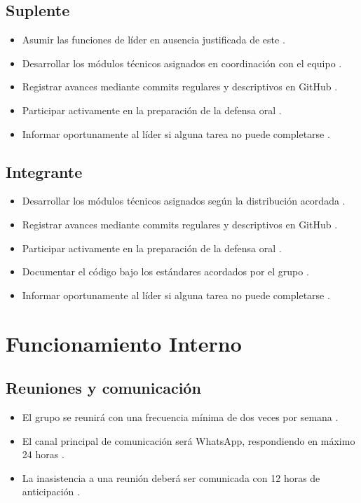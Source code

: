 \documentclass[11pt, a4paper]{article}
\begin{document}
\subsection{Suplente}
\begin{itemize}
    \item Asumir las funciones de líder en ausencia justificada de este \cite{34}.
    \item Desarrollar los módulos técnicos asignados en coordinación con el equipo \cite{35}.
    \item Registrar avances mediante commits regulares y descriptivos en GitHub \cite{36}.
    \item Participar activamente en la preparación de la defensa oral \cite{37}.
    \item Informar oportunamente al líder si alguna tarea no puede completarse \cite{38}.
\end{itemize}

\subsection{Integrante}
\begin{itemize}
    \item Desarrollar los módulos técnicos asignados según la distribución acordada \cite{43}.
    \item Registrar avances mediante commits regulares y descriptivos en GitHub \cite{44}.
    \item Participar activamente en la preparación de la defensa oral \cite{45}.
    \item Documentar el código bajo los estándares acordados por el grupo \cite{46}.
    \item Informar oportunamente al líder si alguna tarea no puede completarse \cite{47}.
\end{itemize}

\section{Funcionamiento Interno}

\subsection{Reuniones y comunicación}
\begin{itemize}
    \item El grupo se reunirá con una frecuencia mínima de dos veces por semana \cite{51}.
    \item El canal principal de comunicación será WhatsApp, respondiendo en máximo 24 horas \cite{53}.
    \item La inasistencia a una reunión deberá ser comunicada con 12 horas de anticipación \cite{55}.
\end{itemize}
\end{document}
